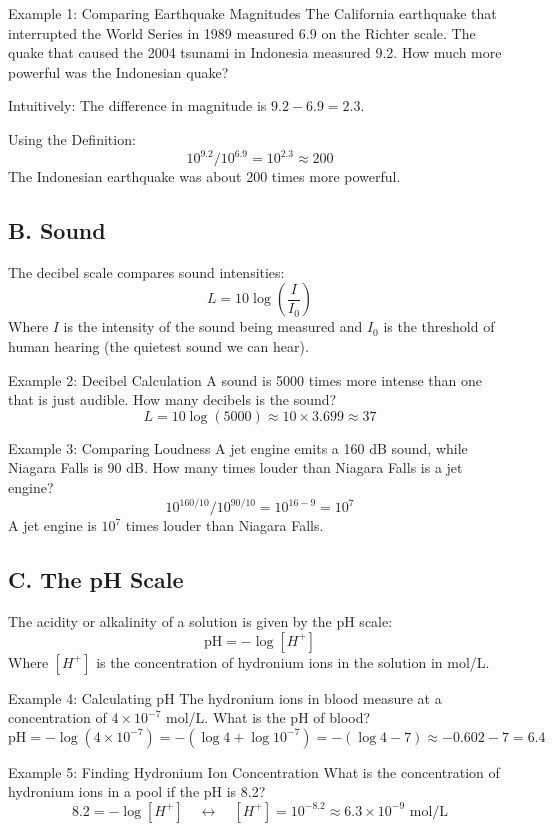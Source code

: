 \documentclass{article}
\begin{document}
\begin{examplebox}{Example 1: Comparing Earthquake Magnitudes}
The California earthquake that interrupted the World Series in 1989 measured 6.9 on the Richter scale. The quake that caused the 2004 tsunami in Indonesia measured 9.2. How much more powerful was the Indonesian quake?

Intuitively:
The difference in magnitude is \( 9.2 - 6.9 = 2.3 \).

Using the Definition:
\[
10^{9.2} / 10^{6.9} = 10^{2.3} \approx 200
\]
The Indonesian earthquake was about 200 times more powerful.
\end{examplebox}

\subsection{B. Sound}
The decibel scale compares sound intensities:
\[
L = 10 \log{\left(\frac{I}{I_0}\right)}
\]
Where \( I \) is the intensity of the sound being measured and \( I_0 \) is the threshold of human hearing (the quietest sound we can hear).

\begin{examplebox}{Example 2: Decibel Calculation}
A sound is 5000 times more intense than one that is just audible. How many decibels is the sound?
\[
L = 10 \log{(5000)} \approx 10 \times 3.699 \approx 37
\]
\end{examplebox}

\begin{examplebox}{Example 3: Comparing Loudness}
A jet engine emits a 160 dB sound, while Niagara Falls is 90 dB. How many times louder than Niagara Falls is a jet engine?
\[
10^{160/10} / 10^{90/10} = 10^{16 - 9} = 10^7
\]
A jet engine is \( 10^7 \) times louder than Niagara Falls.
\end{examplebox}

\subsection{C. The pH Scale}
The acidity or alkalinity of a solution is given by the pH scale:
\[
\text{pH} = -\log{[H^+]}
\]
Where \([H^+]\) is the concentration of hydronium ions in the solution in mol/L.

\begin{examplebox}{Example 4: Calculating pH}
The hydronium ions in blood measure at a concentration of \( 4 \times 10^{-7} \) mol/L. What is the pH of blood?
\[
\text{pH} = -\log{(4 \times 10^{-7})} = -(\log{4} + \log{10^{-7}}) = -(\log{4} - 7) \approx -0.602 - 7 = 6.4
\]
\end{examplebox}

\begin{examplebox}{Example 5: Finding Hydronium Ion Concentration}
What is the concentration of hydronium ions in a pool if the pH is 8.2?
\[
8.2 = -\log{[H^+]} \quad \leftrightarrow \quad [H^+] = 10^{-8.2} \approx 6.3 \times 10^{-9} \text{ mol/L}
\]
\end{examplebox}
\end{document}
